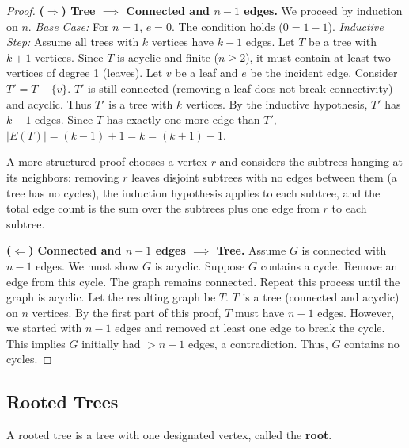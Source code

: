 \begin{proof}
\textbf{($\Rightarrow$) Tree $\implies$ Connected and $n-1$ edges.}
We proceed by induction on $n$.
\textit{Base Case:} For $n=1$, $e=0$. The condition holds ($0 = 1-1$).
\textit{Inductive Step:} Assume all trees with $k$ vertices have $k-1$ edges. Let $T$ be a tree with $k+1$ vertices.
Since $T$ is acyclic and finite ($n \ge 2$), it must contain at least two vertices of degree 1 (leaves). Let $v$ be a leaf and $e$ be the incident edge.
Consider $T' = T - \{v\}$. $T'$ is still connected (removing a leaf does not break connectivity) and acyclic. Thus $T'$ is a tree with $k$ vertices.
By the inductive hypothesis, $T'$ has $k-1$ edges. Since $T$ has exactly one more edge than $T'$, $|E(T)| = (k-1) + 1 = k = (k+1)-1$.

A more structured proof chooses a vertex $r$ and considers the subtrees hanging at its neighbors: removing $r$ leaves disjoint subtrees with no edges between them (a tree has no cycles), the induction hypothesis applies to each subtree, and the total edge count is the sum over the subtrees plus one edge from $r$ to each subtree.

\textbf{($\Leftarrow$) Connected and $n-1$ edges $\implies$ Tree.}
Assume $G$ is connected with $n-1$ edges. We must show $G$ is acyclic.
Suppose $G$ contains a cycle. Remove an edge from this cycle. The graph remains connected. Repeat this process until the graph is acyclic. Let the resulting graph be $T$.
$T$ is a tree (connected and acyclic) on $n$ vertices. By the first part of this proof, $T$ must have $n-1$ edges.
However, we started with $n-1$ edges and removed at least one edge to break the cycle. This implies $G$ initially had $> n-1$ edges, a contradiction. Thus, $G$ contains no cycles.
\end{proof}

\subsection{Rooted Trees}

\begin{definition}
A rooted tree is a tree with one designated vertex, called the \textbf{root}.
\end{definition}

